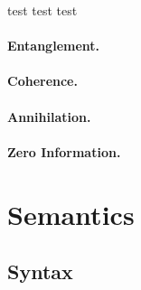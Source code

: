 \documentclass[preprint]{sigplanconf}
\begin{document}
test test test
\begin{multicols}{2}
\begin{center}
\end{center}

\begin{center}
\end{center}  
\end{multicols}


\paragraph*{Entanglement.}

\paragraph*{Coherence.}

\paragraph*{Annihilation.}

\paragraph*{Zero Information.}

\section{Semantics}

\subsection{Syntax}

%
%
%
\end{document}
